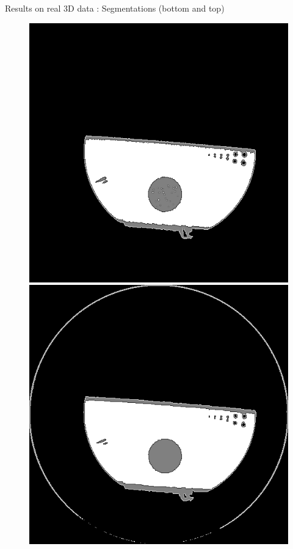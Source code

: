 \documentclass[latex]{beamer}
\begin{document}
\begin{frame}{}
\begin{block}{Results on real 3D data : Segmentations (bottom and top)}
\begin{figure}
\begin{minipage}[htb]{0.30\linewidth}
\centering
\includegraphics[scale=0.19]{segmentation_FDKK4Proj300Bas.png}
\end{minipage} \hfill
\begin{minipage}[htb]{0.30\linewidth}
\centering
\includegraphics[scale=0.19]{segmentationIQI_TVGamma3K4Proj300Bas.png}

\end{minipage}
\end{figure}
\end{block}
\end{frame}
\end{document}
